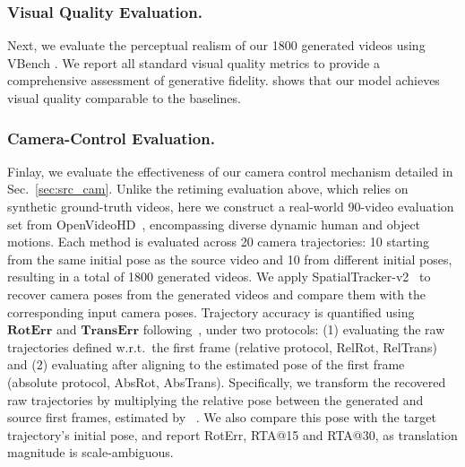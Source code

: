 \subsubsection{Visual Quality Evaluation.}
Next, we evaluate the perceptual realism of our 1800 generated videos using VBench \cite{huang2023vbench}. We report all standard visual quality metrics to provide a comprehensive assessment of generative fidelity. 
 shows that our model achieves visual quality comparable to the baselines.







\subsubsection{Camera-Control Evaluation.}
Finlay, we evaluate the effectiveness of our camera control mechanism detailed in Sec.~\ref{sec:src_cam}.
Unlike the retiming evaluation above, which relies on synthetic ground-truth videos, here we construct a real-world 90-video evaluation set from OpenVideoHD~\cite{nan2024openvid}, encompassing diverse dynamic human and object motions.
Each method is evaluated across 20 camera trajectories: 10 starting from the same initial pose as the source video and 10 from different initial poses, resulting in a total of 1800 generated videos.
We apply SpatialTracker-v2~\cite{Xiao2025} to recover camera poses from the generated videos and compare them with the corresponding input camera poses.
Trajectory accuracy is quantified using $\mathbf{RotErr}$ and $\mathbf{TransErr}$ following~\cite{He2025camctrl}, under two protocols: (1) evaluating the raw trajectories defined w.r.t.~the first frame (relative protocol, RelRot, RelTrans) and (2) evaluating after aligning to the estimated pose of the first frame (absolute protocol, AbsRot, AbsTrans).
Specifically, we transform the recovered raw trajectories by multiplying the relative pose between the generated and source first frames, estimated by \duster~\cite{dust3r_cvpr24}. 
We also compare this \duster pose with the target trajectory’s initial pose, and report RotErr, RTA@15 and RTA@30, as translation magnitude is scale-ambiguous.




